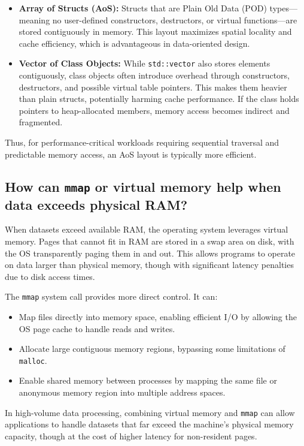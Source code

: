\documentclass[11pt,letterpaper,oneside]{article}
\begin{document}
\begin{itemize}
    \item \textbf{Array of Structs (AoS):} Structs that are Plain Old Data (POD)
    types—meaning no user-defined constructors, destructors, or virtual
    functions—are stored contiguously in memory. This layout maximizes spatial
    locality and cache efficiency, which is advantageous in data-oriented
    design.
    \item \textbf{Vector of Class Objects:} While \texttt{std::vector} also
    stores elements contiguously, class objects often introduce overhead through
    constructors, destructors, and possible virtual table pointers. This makes
    them heavier than plain structs, potentially harming cache performance. If
    the class holds pointers to heap-allocated members, memory access becomes
    indirect and fragmented.
\end{itemize}

Thus, for performance-critical workloads requiring sequential traversal and
predictable memory access, an AoS layout is typically more efficient.

\subsection{How can \texttt{mmap} or virtual memory help when data exceeds
physical RAM?}

When datasets exceed available RAM, the operating system leverages virtual
memory. Pages that cannot fit in RAM are stored in a swap area on disk, with the
OS transparently paging them in and out. This allows programs to operate on data
larger than physical memory, though with significant latency penalties due to
disk access times.

The \texttt{mmap} system call provides more direct control. It can:

\begin{itemize}
    \item Map files directly into memory space, enabling efficient I/O by
    allowing the OS page cache to handle reads and writes.
    \item Allocate large contiguous memory regions, bypassing some limitations
    of \texttt{malloc}.
    \item Enable shared memory between processes by mapping the same file or
    anonymous memory region into multiple address spaces.
\end{itemize}

In high-volume data processing, combining virtual memory and \texttt{mmap} can
allow applications to handle datasets that far exceed the machine’s physical
memory capacity, though at the cost of higher latency for non-resident pages.


\printbibliography
\end{document}
